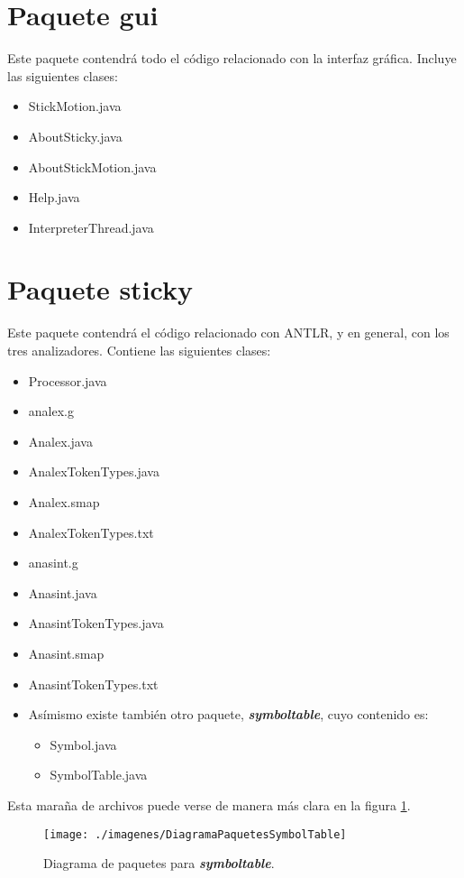    \section{Paquete gui}
   Este paquete contendrá todo el código relacionado con la interfaz gráfica. Incluye las siguientes clases:
   \begin{itemize}
      \item StickMotion.java
      \item AboutSticky.java
      \item AboutStickMotion.java
      \item Help.java
      \item InterpreterThread.java
   \end{itemize}


   \section{Paquete sticky}
   Este paquete contendrá el código relacionado con ANTLR, y en general, con los tres analizadores. Contiene las siguientes clases:
   \begin{itemize}
      \item Processor.java
      \item analex.g
      \item Analex.java
      \item AnalexTokenTypes.java 
      \item Analex.smap 
      \item AnalexTokenTypes.txt
      \item anasint.g 
      \item Anasint.java 
      \item AnasintTokenTypes.java 
      \item Anasint.smap
      \item AnasintTokenTypes.txt
      \item Asímismo existe también otro paquete, \textbf{\textit{symboltable}}, cuyo contenido es:
            \begin{itemize}
               \item Symbol.java
               \item SymbolTable.java
            \end{itemize}
   \end{itemize}

   Esta maraña de archivos puede verse de manera más clara en la figura \ref{paqueteSymbolTable}.

   \begin{figure} [H] \begin{center}
   \texttt{[image: ./imagenes/DiagramaPaquetesSymbolTable]}\label{paqueteSymbolTable}
   \caption{Diagrama de paquetes para \textbf{\textit{symboltable}}.}
   \end{center} \end{figure}

